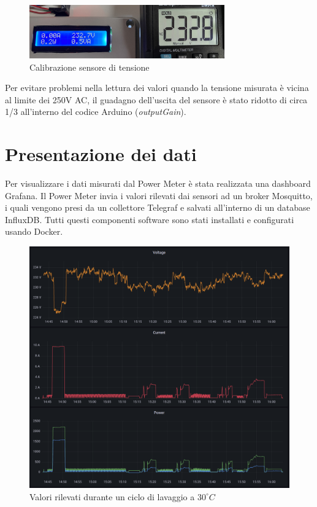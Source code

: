 \documentclass[italian,12pt,a4paper,oneside,final]{report}
\begin{document}
\begin{figure}[h]
	\centering
	\includegraphics[width=0.75\textwidth]{voltage_calibration.jpg}
	\caption{Calibrazione sensore di tensione}
	\label{fig:voltage_calibration}
\end{figure}

Per evitare problemi nella lettura dei valori quando la tensione misurata è vicina al limite dei 250V AC, il guadagno dell'uscita del sensore è stato ridotto di circa 1/3 all'interno del codice Arduino (\textit{outputGain}).

\section{Presentazione dei dati}
Per visualizzare i dati misurati dal Power Meter è stata realizzata una dashboard Grafana.
Il Power Meter invia i valori rilevati dai sensori ad un broker Mosquitto, i quali vengono presi da un collettore Telegraf e salvati all'interno di un database InfluxDB.
Tutti questi componenti software sono stati installati e configurati usando Docker.

\begin{figure}[h]
	\centering
	\includegraphics[width=1\textwidth]{grafana_lavatrice.png}
	\caption{Valori rilevati durante un ciclo di lavaggio a $30^\circ C$}
	\label{fig:grafana_lavatrice}
\end{figure}
\end{document}
